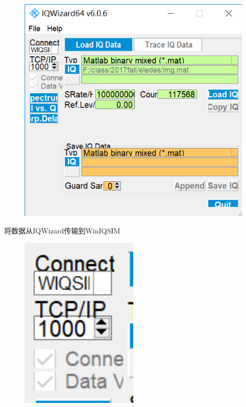 \documentclass[UTF8]{ctexart}
\begin{document}
\begin{figure}[H]
        \centering
        \includegraphics[width=\textwidth]{images//loadmat.png}
\end{figure}

将数据从IQWizard传输到WinIQSIM

\begin{figure}[H]
        \centering
        \includegraphics[width=0.5\textwidth]{images//transform.png}
\end{figure}
\end{document}
